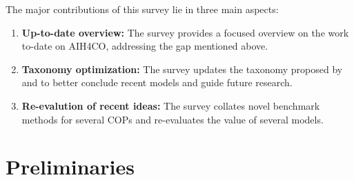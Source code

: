 \documentclass[a4paper]{article}
\begin{document}
The major contributions of this survey lie in three main aspects:
\begin{enumerate}
    \item {\textbf{Up-to-date overview:}} The survey provides a focused overview on the work to-date on AIH4CO, addressing the gap mentioned above.
    \item {\textbf{Taxonomy optimization:}} The survey updates the taxonomy proposed by \citet{Maryam} and \citet{Talbi} to better conclude recent models and guide future research.
    \item {\textbf{Re-evalution of recent ideas:}} The survey collates novel benchmark methods for several COPs and re-evaluates the value of several models.
\end{enumerate}

\section{Preliminaries}
\end{document}
